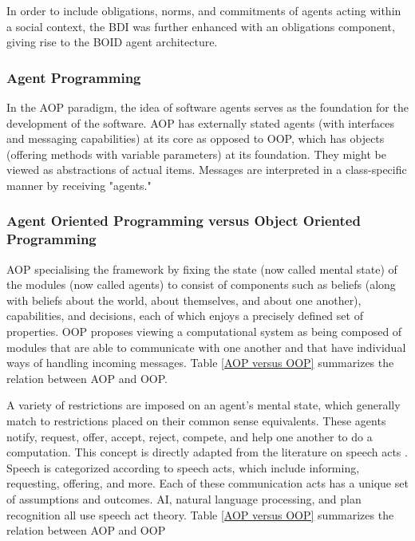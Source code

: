 In order to include obligations, norms, and commitments of agents acting within a social context, the \ac{BDI} was further enhanced with an obligations component, giving rise to the \ac{BOID} \cite{boid} agent architecture.


\subsubsection{Agent Programming}

In the \ac{AOP} paradigm, the idea of software agents serves as the foundation for the development of the software. \ac{AOP} has externally stated agents (with interfaces and messaging capabilities) at its core as opposed to \ac{OOP}, which has objects (offering methods with variable parameters) at its foundation. They might be viewed as abstractions of actual items. Messages are interpreted in a class-specific manner by receiving "agents."

\subsubsection{Agent Oriented Programming versus Object Oriented Programming}

\ac{AOP} specialising the framework by fixing the state (now called mental state) of the modules (now called agents) to consist of components such as beliefs (along with beliefs about the world, about themselves, and about one another), capabilities, and decisions, each of which enjoys a precisely defined set of properties. OOP proposes viewing a computational system as being composed of modules that are able to communicate with one another and that have individual ways of handling incoming messages.  Table \ref{AOP versus OOP} summarizes the relation between \ac{AOP} and \ac{OOP}.

\vspace{.5cm}

A variety of restrictions are imposed on an agent's mental state, which generally match to restrictions placed on their common sense equivalents. These agents notify, request, offer, accept, reject, compete, and help one another to do a computation. This concept is directly adapted from the literature on speech acts \cite{speech}. Speech is categorized according to speech acts, which include informing, requesting, offering, and more. Each of these communication acts has a unique set of assumptions and outcomes. \ac{AI}, natural language processing, and plan recognition all use speech act theory.
 Table \ref{AOP versus OOP} summarizes the relation between AOP and OOP

